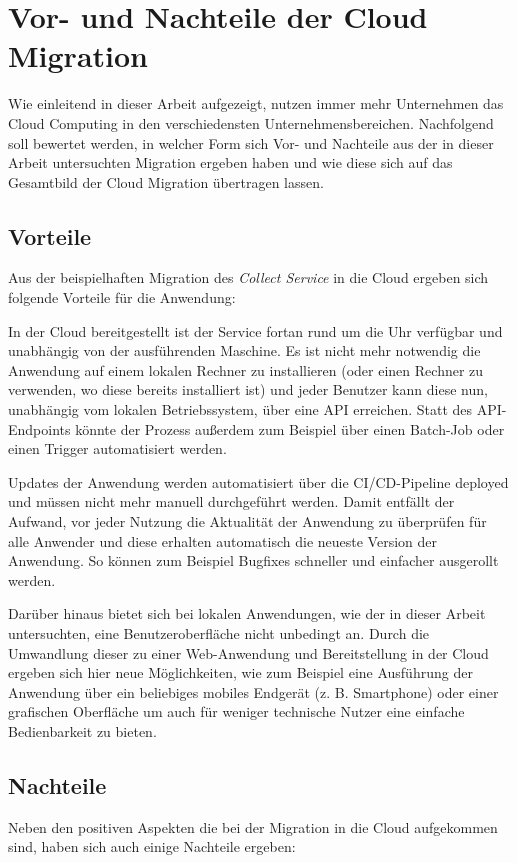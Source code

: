 \section{Vor- und Nachteile der Cloud Migration}
Wie einleitend in dieser Arbeit aufgezeigt, nutzen immer mehr Unternehmen das Cloud Computing in den verschiedensten Unternehmensbereichen. Nachfolgend soll bewertet werden, in welcher Form sich Vor- und Nachteile aus der in dieser Arbeit untersuchten Migration ergeben haben und wie diese sich auf das Gesamtbild der Cloud Migration übertragen lassen.

\subsection{Vorteile}
Aus der beispielhaften Migration des \textit{Collect Service} in die Cloud ergeben sich folgende Vorteile für die Anwendung:

In der Cloud bereitgestellt ist der Service fortan rund um die Uhr verfügbar und unabhängig von der ausführenden Maschine. Es ist nicht mehr notwendig die Anwendung auf einem lokalen Rechner zu installieren (oder einen Rechner zu verwenden, wo diese bereits installiert ist) und jeder Benutzer kann diese nun, unabhängig vom lokalen Betriebssystem, über eine \ac{API} erreichen. Statt des \ac{API}-Endpoints könnte der Prozess außerdem zum Beispiel über einen Batch-Job oder einen Trigger automatisiert werden.

Updates der Anwendung werden automatisiert über die \ac{CI/CD}-Pipeline deployed und müssen nicht mehr manuell durchgeführt werden. Damit entfällt der Aufwand, vor jeder Nutzung die Aktualität der Anwendung zu überprüfen für alle Anwender und diese erhalten automatisch die neueste Version der Anwendung. So können zum Beispiel Bugfixes schneller und einfacher ausgerollt werden. 

Darüber hinaus bietet sich bei lokalen Anwendungen, wie der in dieser Arbeit untersuchten, eine Benutzeroberfläche nicht unbedingt an. Durch die Umwandlung dieser zu einer Web-Anwendung und Bereitstellung in der Cloud ergeben sich hier neue Möglichkeiten, wie zum Beispiel eine Ausführung der Anwendung über ein beliebiges mobiles Endgerät (z. B. Smartphone) oder einer grafischen Oberfläche um auch für weniger technische Nutzer eine einfache Bedienbarkeit zu bieten. \pagebreak

\subsection{Nachteile}
Neben den positiven Aspekten die bei der Migration in die Cloud aufgekommen sind, haben sich auch einige Nachteile ergeben:

